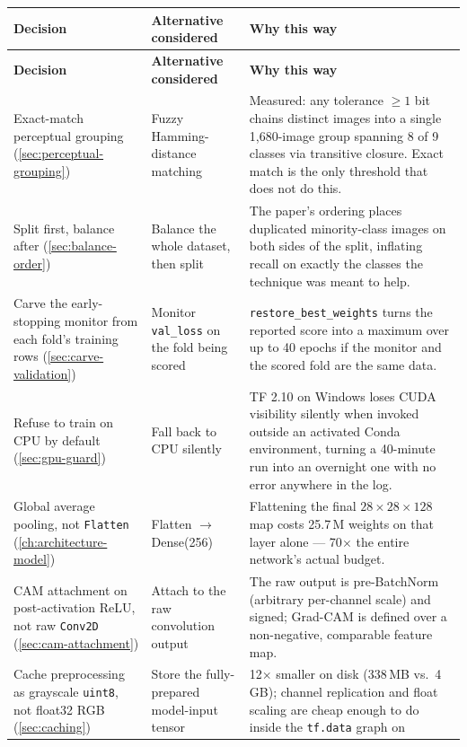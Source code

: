 \documentclass[11pt,a4paper,oneside]{report}
\newcommand{\code}[1]{\texttt{\small #1}}
\begin{document}
\begin{longtable}{@{}p{3.1cm}p{4.6cm}p{6.5cm}@{}}
\toprule
\textbf{Decision} & \textbf{Alternative considered} & \textbf{Why this way} \\
\midrule
\endfirsthead
\toprule
\textbf{Decision} & \textbf{Alternative considered} & \textbf{Why this way} \\
\midrule
\endhead
Exact-match perceptual grouping (\cref{sec:perceptual-grouping}) &
  Fuzzy Hamming-distance matching &
  Measured: any tolerance $\geq 1$ bit chains distinct images into a single
  1{,}680-image group spanning 8 of 9 classes via transitive closure.
  Exact match is the only threshold that does not do this. \\
Split first, balance after (\cref{sec:balance-order}) &
  Balance the whole dataset, then split &
  The paper's ordering places duplicated minority-class images on both
  sides of the split, inflating recall on exactly the classes the technique
  was meant to help. \\
Carve the early-stopping monitor from each fold's training rows
  (\cref{sec:carve-validation}) &
  Monitor \code{val\_loss} on the fold being scored &
  \code{restore\_best\_weights} turns the reported score into a maximum over
  up to 40 epochs if the monitor and the scored fold are the same data. \\
Refuse to train on CPU by default (\cref{sec:gpu-guard}) &
  Fall back to CPU silently &
  TF 2.10 on Windows loses CUDA visibility silently when invoked outside an
  activated Conda environment, turning a 40-minute run into an overnight one
  with no error anywhere in the log. \\
Global average pooling, not \code{Flatten} (\cref{ch:architecture-model}) &
  Flatten $\to$ Dense(256) &
  Flattening the final $28\times28\times128$ map costs 25.7\,M weights on
  that layer alone --- 70$\times$ the entire network's actual budget. \\
CAM attachment on post-activation ReLU, not raw \code{Conv2D}
  (\cref{sec:cam-attachment}) &
  Attach to the raw convolution output &
  The raw output is pre-BatchNorm (arbitrary per-channel scale) and signed;
  Grad-CAM is defined over a non-negative, comparable feature map. \\
Cache preprocessing as grayscale \code{uint8}, not float32 RGB
  (\cref{sec:caching}) &
  Store the fully-prepared model-input tensor &
  12$\times$ smaller on disk (338\,MB vs.\ 4\,GB); channel replication and
  float scaling are cheap enough to do inside the \code{tf.data} graph on

\end{longtable}
\end{document}
